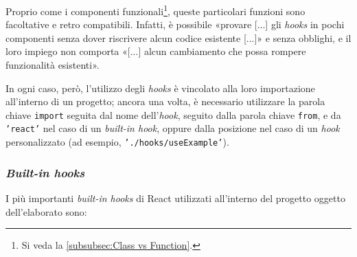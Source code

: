 Proprio come i componenti funzionali\footnote{Si veda la \autoref{subsubsec:Class vs Function}.}, queste particolari funzioni sono facoltative e retro compatibili. Infatti, è possibile «provare [...] gli \textit{hooks} in pochi componenti senza dover riscrivere alcun codice esistente [...]» e senza obblighi, e il loro impiego non comporta «[...] alcun cambiamento che possa rompere funzionalità esistenti»\cite{React_IntroduzioneHooks_Retrocompatibilità}.

In ogni caso, però, l'utilizzo degli \textit{hooks} è vincolato alla loro importazione all'interno di un progetto; ancora una volta, è necessario utilizzare la parola chiave \texttt{import} seguita dal nome dell'\textit{hook}, seguito dalla parola chiave \texttt{from}, e da \texttt{'react'} nel caso di un \textit{built-in hook}, oppure dalla posizione nel caso di un \textit{hook} personalizzato (ad esempio, \texttt{'./hooks/useExample'}).

\subsubsection{\textit{Built-in hooks}}
\label{subsubsec:Built-in hooks}
I più importanti \textit{built-in hooks} di React utilizzati all'interno del progetto oggetto dell'elaborato sono:


